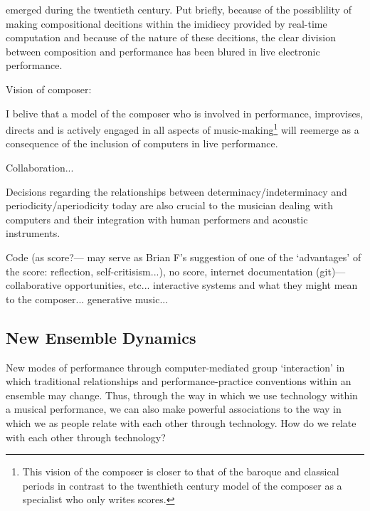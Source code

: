 emerged during the twentieth century. Put briefly, because of the possiblility of making compositional decitions within the imidiecy provided by real-time computation and because of the nature of these decitions, the clear division between composition and performance has been blured in live electronic performance. 

Vision of composer:

I belive that a model of the composer who is involved in performance, improvises, directs and is actively engaged in all aspects of music-making\footnote{This vision of the composer is closer to that of the baroque and classical periods in contrast to the twenthieth century model of the composer as a specialist who only writes scores.} will reemerge as a consequence of the inclusion of computers in live performance.

Collaboration...

Decisions regarding the relationships between determinacy/indeterminacy and periodicity/aperiodicity today are also crucial to the musician dealing with computers and their integration with human performers and acoustic instruments.

Code (as score?--- may serve as Brian F's suggestion of one of the `advantages' of the score: reflection, self-critisism...), no score, internet documentation (git)---collaborative opportunities, etc... interactive systems and what they might mean to the composer... generative music...

\subsection{New Ensemble Dynamics}

New modes of performance through computer-mediated group `interaction' in which traditional relationships and performance-practice conventions within an ensemble may change. Thus, through the way in which we use technology within a musical performance, we can also make powerful associations to the way in which we as people relate with each other through technology. How do we relate with each other through technology?


\label{ch:strategies}